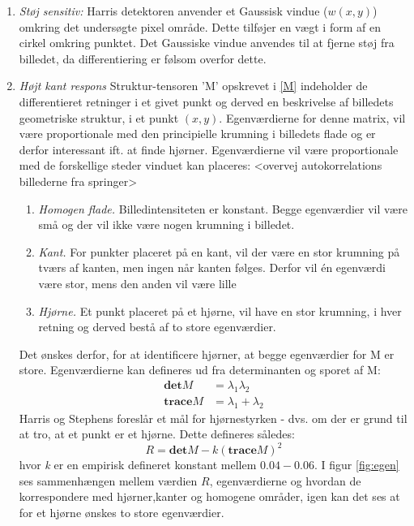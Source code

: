 \begin{enumerate}
\item{\textit{Støj sensitiv:} Harris detektoren anvender et Gaussisk vindue ($w(x,y)$) omkring det undersøgte pixel område. Dette tilføjer en vægt i form af en cirkel omkring punktet. Det Gaussiske vindue anvendes til at fjerne støj fra billedet, da differentiering er følsom overfor dette.}
\item{\textit{Højt kant respons} Struktur-tensoren 'M' opskrevet i \eqref{M} indeholder de differentieret retninger i et givet punkt og derved en beskrivelse af billedets geometriske struktur, i et punkt $(x,y)$. Egenværdierne for denne matrix, vil være proportionale med den principielle krumning i billedets flade og er derfor interessant ift. at finde hjørner. Egenværdierne vil være proportionale med de forskellige steder vinduet kan placeres:
<overvej autokorrelations billederne fra springer>
\begin{enumerate}
\item{ \textit{Homogen flade.} Billedintensiteten er konstant. Begge egenværdier vil være små og der vil ikke være nogen krumning i billedet.}
\item{\textit{Kant.} For punkter placeret på en kant, vil der være en stor krumning på tværs af kanten, men ingen når kanten følges. Derfor vil én egenværdi være stor, mens den anden vil være lille}
\item{\textit{Hjørne.} Et punkt placeret på et hjørne, vil have en stor krumning, i hver retning og derved bestå af to store egenværdier.}
\end{enumerate}
Det ønskes derfor, for at identificere hjørner, at begge egenværdier for M er store. Egenværdierne kan defineres ud fra determinanten og sporet af M:
\begin{subequations}
\begin{align}
\textbf{det}M & = \lambda_1 \lambda_2 \\
\textbf{trace}M & = \lambda_1+\lambda_2
\end{align}
\end{subequations}
Harris og Stephens foreslår et mål for hjørnestyrken - dvs. om der er grund til at tro, at et punkt er et hjørne. Dette defineres således:
\begin{equation}
R = \textbf{det}M-k(\textbf{trace}M)^2
\label{rvalharris}
\end{equation}
hvor \textit{k} er en empirisk defineret konstant mellem $0.04-0.06$. I figur \ref{fig:egen} ses sammenhængen mellem værdien $R$, egenværdierne og hvordan de korrespondere med hjørner,kanter og homogene områder, igen kan det ses at for et hjørne ønskes to store egenværdier.

}
\end{enumerate}
